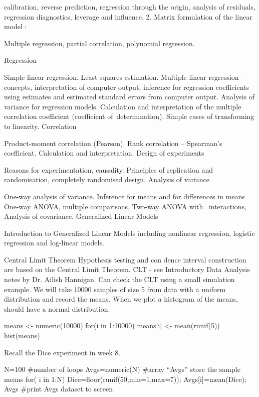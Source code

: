 \documentclass[a4paper,12pt]{article}
\begin{document}
calibration, reverse prediction, regression through the origin, analysis of residuals, regression diagnostics, leverage and influence.
2. Matrix formulation of the linear model :

Multiple regression, partial correlation, polynomial regression.

Regression

Simple linear regression. Least squares estimation.
Multiple linear regression – concepts, interpretation of computer output, inference for regression coefficients using estimates and estimated standard errors from computer output.
Analysis of variance for regression models.
Calculation and interpretation of the multiple correlation coefficient (coefficient of determination).
Simple cases of transforming to linearity.
Correlation

Product-moment correlation (Pearson).
Rank correlation – Spearman’s coefficient.
Calculation and interpretation.
Design of experiments

Reasons for experimentation, causality.
Principles of replication and randomisation, completely randomised design.
Analysis of variance

One-way analysis of variance.
Inference for means and for differences in means
One-way ANOVA, multiple comparisons,
Two-way ANOVA with  interactions,
Analysis of covariance.
Generalized Linear Models

Introduction to Generalized Linear Models including nonlinear regression, logistic regression and log-linear models.



 
Central Limit Theorem
Hypothesis testing and con dence interval construction are based on the Central Limit Theorem.
CLT - see Introductory Data Analysis notes by Dr. Ailish Hannigan.
Can check the CLT using a small simulation example.
We will take 10000 samples of size 5 from data with a uniform distribution and record the means.
When we plot a histogram of the means, should have a normal distribution.
 
means <- numeric(10000)
for(i in 1:10000){
means[i] <- mean(runif(5))
}
hist(means)
 

Recall the Dice experiment in week 8.
 
N=100           	          	          	             #number of loops
Avgs=numeric(N)           	             #array “Avgs” store the sample means
for( i in 1:N)
              {              Dice=floor(runif(50,min=1,max=7));              Avgs[i]=mean(Dice);
              }
Avgs           	          	          	             #print Avgs dataset to screen
 
\end{document}
